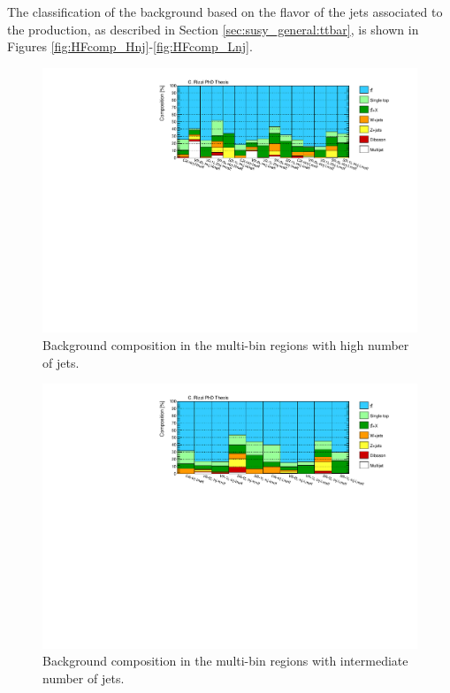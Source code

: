 The classification of the \ttbar background based on the flavor of the jets associated to the 
\ttbar production, as described in Section \ref{sec:susy_general:ttbar}, is shown in Figures 
\ref{fig:HFcomp_Hnj}-\ref{fig:HFcomp_Lnj}.

\begin{figure}[htbp]
\includegraphics[width=\textwidth]{figures/Chap8/Rizzi-Fig8-20.pdf}
\caption{Background composition in the multi-bin regions with high number of jets.}
	\label{fig:bkgcomp_Hnj}
\end{figure}

\begin{figure}[htbp]
\includegraphics[width=\textwidth]{figures/Chap8/Rizzi-Fig8-21.pdf}
\caption{Background composition in the multi-bin regions with intermediate number of jets.}
	\label{fig:bkgcomp_Inj}
\end{figure}

